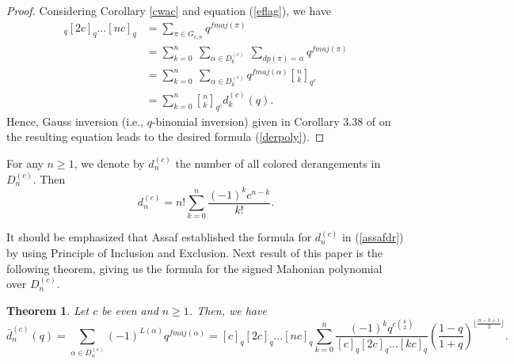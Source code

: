 \documentclass[a4paper,12pt]{article}
\newtheorem{thm}{Theorem}[section]
\begin{document}
\begin{proof}
Considering Corollary \ref{cwac} and equation (\ref{eflag}), we have
\begin{align*}
[c]_q[2c]_q\dots [nc]_q&=\sum_{\pi \in G_{c,n}}q^{fmaj(\pi)}\\
&=\sum_{k=0}^n~\sum_{\alpha \in D_k^{(c)}}~\sum_{dp(\pi)=\alpha}q^{fmaj(\pi)}\\
&=\sum_{k=0}^n~\sum_{\alpha \in D_k^{(c)}}q^{fmaj(\alpha)}{n \brack k}_{q^c}\\
&=\sum_{k=0}^n {n \brack k}_{q^c} d_k^{(c)}(q).
\end{align*}
Hence, Gauss inversion (i.e., $q$-binomial inversion) given in Corollary 3.38 of \cite{aigner1979} on the resulting equation leads to the desired formula (\ref{derpoly}).
\end{proof}

For any $n \geq 1$, we denote by $d_{n}^{(c)}$ the number of all colored derangements in $D_n^{(c)}$. Then 
\begin{equation}\label{assafdr}
    d_{n}^{(c)}=n! \sum_{k=0}^{n} \frac{(-1)^k c^{n-k}}{k!}.
\end{equation}

It should be emphasized that Assaf \cite{assaf2010} established the formula for $d_{n}^{(c)}$ in (\ref{assafdr}) by using Principle of Inclusion and Exclusion. Next result of this paper is the following theorem, giving us the formula for the signed Mahonian polynomial over $D_n^{(c)}$.

\begin{thm}\label{t6}
Let $c$ be even and $n \geq 1$. Then, we have
$$\bar{d}_{n}^{(c)}(q)=\sum_{\alpha \in D_{n}^{(c)}}(-1)^{L(\alpha)}q^{fmaj(\alpha)}=[c]_q[2c]_q\dots [nc]_q \sum_{k=0}^n \frac{(-1)^k q^{c \binom{k}{2}}}{[c]_q[2c]_q\dots [kc]_q} \left( \frac{1-q}{1+q}\right)^{\lfloor{\frac{n-k+1}{2}}\rfloor}.$$
\end{thm}
\end{document}
